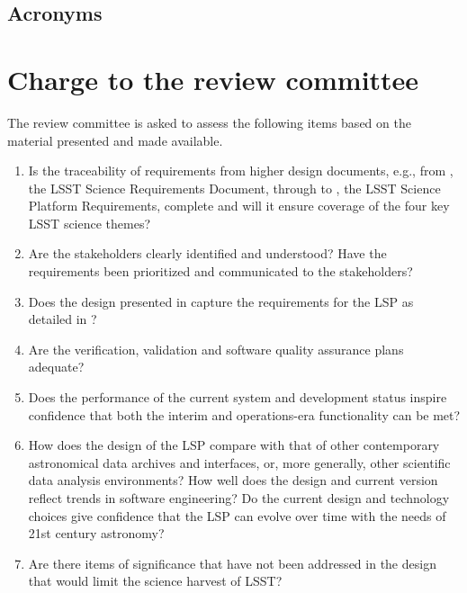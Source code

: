 \documentclass[DM,lsstdraft,STS,toc]{lsstdoc}
\begin{document}
\subsection{Acronyms \label{sect:acronyms}} %



\newpage
\section{Charge to the review committee}
\label{sec:charge}
The review committee is asked to assess the following items based on the material presented and made available.
%
\begin{enumerate}

\item Is the traceability of requirements from higher design documents, e.g., from , the LSST Science Requirements Document,
through to , the LSST Science Platform Requirements, complete and will it ensure coverage of the four key LSST science themes?
%
\item Are the stakeholders clearly identified and understood? Have the requirements been prioritized and communicated to the stakeholders?
%
\item Does the design presented in  capture the requirements for the LSP as detailed in ?
%
\item Are the verification, validation and software quality assurance plans adequate?
%
\item Does the performance of the current system and development status inspire confidence that both the interim and operations-era functionality can be met?
%
\item How does the design of the LSP compare with that of other contemporary astronomical data archives and interfaces, or, more generally, other scientific data analysis environments?
How well does the design and current version reflect trends in software engineering? Do the current design and technology choices give confidence that the LSP can
evolve over time with the needs of 21st century astronomy?
%
\item Are there items of significance that have not been addressed in the design that would limit the science harvest of LSST?

\end{enumerate}
\end{document}
